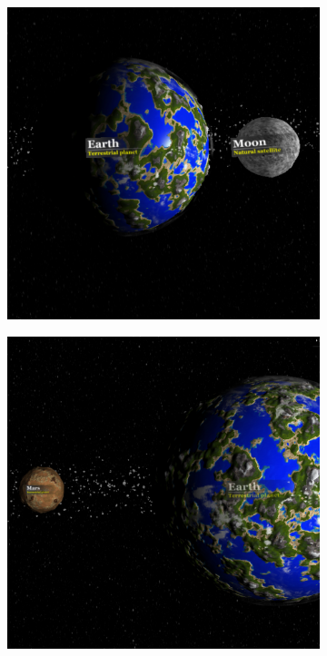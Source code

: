 \documentclass[paper=a4, fontsize=11pt]{scrartcl} %
\numberwithin{equation}{section} %
\numberwithin{figure}{section} %
\numberwithin{table}{section} %
\theoremstyle{definition}
\begin{document}
\begin{figure}
	\centering
	\begin{subfigure}{.32\textwidth}
		\centering
		\includegraphics[width=1.0\linewidth]{images/labels1.png}
	\end{subfigure}
	\begin{subfigure}{.32\textwidth}
		\centering
		\includegraphics[width=1.0\linewidth]{images/labels2.png}

\end{subfigure}
\end{figure}
\end{document}
